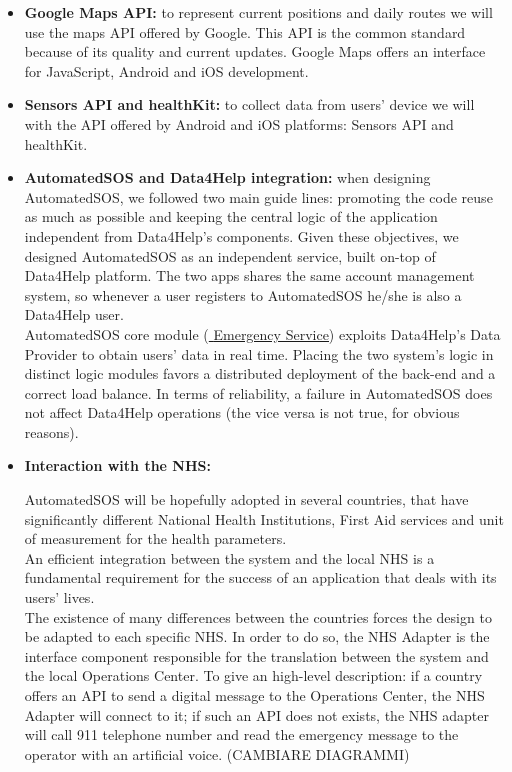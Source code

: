 \begin{itemize}
    \item \textbf{Google Maps API:} to represent current positions and daily routes we will use the maps API offered by Google. This API is the common standard because of its quality and current updates. Google Maps offers an interface for JavaScript\cite{mapsAPI-JS}, Android\cite{mapsAPI-Android} and iOS\cite{mapsAPI-iOS} development.
    \item \textbf{Sensors API and healthKit:} to collect data from users' device we will with the API offered by Android and iOS platforms: Sensors API\cite{sensorsAPI} and healthKit\cite{healthKit}.
    \item \textbf{AutomatedSOS and Data4Help integration:} when designing AutomatedSOS, we followed two main guide lines: promoting the code reuse as much as possible and keeping the central logic of the application independent from Data4Help's components.
    Given these objectives, we designed AutomatedSOS as an independent service, built on-top of Data4Help platform. 
    The two apps shares the same account management system, so whenever a user registers to AutomatedSOS he/she is also a Data4Help user.\\
    AutomatedSOS core module (\hyperlink{ES}{ \underline{Emergency Service}}) exploits Data4Help's Data Provider to obtain users' data in real time.
    Placing the two system's logic in distinct logic modules favors a distributed deployment of the back-end and a correct load balance.
    In terms of reliability, a failure in AutomatedSOS does not affect Data4Help operations (the vice versa is not true, for obvious reasons).
    \item \hypertarget{NHS_API}{\textbf{Interaction with the NHS:}} AutomatedSOS will be hopefully adopted in several countries, that have significantly different National Health Institutions, First Aid services and unit of measurement for the health parameters.\\
    An efficient integration between the system and the local NHS is a fundamental requirement for the success of an application that deals with its users' lives.\\
    The existence of many differences between the countries forces the design to be adapted to each specific NHS. In order to do so, the NHS Adapter is the interface component responsible for the translation between the system and the local Operations Center.
    To give an high-level description: if a country offers an API to send a digital message to the Operations Center, the NHS Adapter will connect to it; if such an API does not exists, the NHS adapter will call 911 telephone number and read the emergency message to the operator with an artificial voice.
    (CAMBIARE DIAGRAMMI)
\end{itemize}